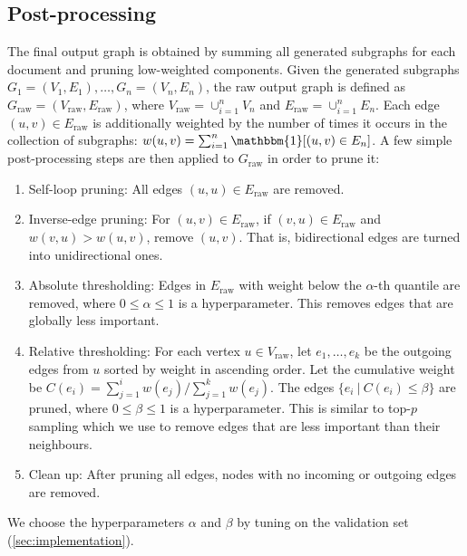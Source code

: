 \documentclass{article}
\begin{document}
\subsection{Post-processing}  \label{sec:method:post-processing}

The final output graph is obtained by summing all generated subgraphs for each document and pruning low-weighted components. Given the generated subgraphs $G_1 = (V_1, E_1), \dots, G_n = (V_n, E_n)$, the raw output graph is defined as $G_\text{raw} = (V_\text{raw}, E_\text{raw})$, where $V_\text{raw} = \cup_{i=1}^n V_n$ and $E_\text{raw} = \cup_{i=1}^n E_n$. Each edge $(u, v) \in E_\text{raw}$ is additionally weighted by the number of times it occurs in the collection of subgraphs: $w(u, v) = \sum_{i=1}^n \mathbbm{1}[(u,v) \in E_n]$. A few simple post-processing steps are then applied to $G_\text{raw}$ in order to prune it:
\begin{enumerate}[itemsep=1pt,leftmargin=*]
    \item Self-loop pruning: All edges $(u, u) \in E_\text{raw}$ are removed.
    \item Inverse-edge pruning: For $(u, v) \in E_\text{raw}$, if $(v, u) \in E_\text{raw}$ and $w(v, u) > w(u, v)$, remove $(u, v)$. That is, bidirectional edges are turned into unidirectional ones.
    \item Absolute thresholding: Edges in $E_\text{raw}$ with weight below the $\alpha$-th quantile are removed, where $0 \leq \alpha \leq 1$ is a hyperparameter. This removes edges that are globally less important.
    \item Relative thresholding: For each vertex $u \in V_\text{raw}$, let $e_1, \dots, e_k$ be the outgoing edges from $u$ sorted by weight in ascending order. Let the cumulative weight be $C(e_i) = \sum_{j=1}^i w(e_j) / \sum_{j=1}^k w(e_j)$. The edges $\{e_i\ |\ C(e_i) \leq \beta\}$ are pruned, where $0 \leq \beta \leq 1$ is a hyperparameter. This is similar to top-$p$ sampling \cite{holtzman2019curious} which we use to remove edges that are less important than their neighbours.
    \item Clean up: After pruning all edges, nodes with no incoming or outgoing edges are removed.
\end{enumerate}
We choose the hyperparameters $\alpha$ and $\beta$ by tuning on the validation set (\cref{sec:implementation}).
\end{document}
